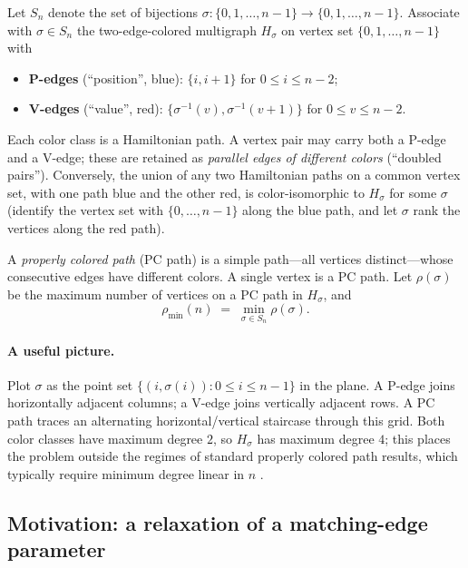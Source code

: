\documentclass[11pt]{article}
\theoremstyle{definition}
\newcommand{\pmin}{\rho_{\min}}
\newcommand{\inv}[1]{#1^{-1}}
\begin{document}
Let $S_n$ denote the set of bijections
$\sigma\colon \{0,1,\dots,n-1\}\to\{0,1,\dots,n-1\}$.
Associate with $\sigma \in S_n$ the two-edge-colored multigraph $H_\sigma$ on vertex
set $\{0,1,\dots,n-1\}$ with
\begin{itemize}
\item \textbf{P-edges} (``position'', blue): $\{i, i+1\}$ for $0 \le i \le n-2$;
\item \textbf{V-edges} (``value'', red): $\{\inv\sigma(v), \inv\sigma(v+1)\}$ for
$0 \le v \le n-2$.
\end{itemize}
Each color class is a Hamiltonian path. A vertex pair may carry both a P-edge and a
V-edge; these are retained as \emph{parallel edges of different colors} (``doubled
pairs''). Conversely, the union of any two Hamiltonian paths on a common vertex set,
with one path blue and the other red, is color-isomorphic to $H_\sigma$ for some
$\sigma$ (identify the vertex set with $\{0,\dots,n-1\}$ along the blue path, and let
$\sigma$ rank the vertices along the red path).

A \emph{properly colored path} (PC path) is a simple path---all vertices
distinct---whose consecutive edges have different colors. A single vertex is a PC
path. Let $\rho(\sigma)$ be the maximum number of vertices on a PC path in $H_\sigma$,
and
\[
\pmin(n) \;=\; \min_{\sigma\in S_n} \rho(\sigma) .
\]

\paragraph{A useful picture.} Plot $\sigma$ as the point set
$\{(i,\sigma(i)) : 0\le i\le n-1\}$ in the plane. A P-edge joins horizontally adjacent
columns; a V-edge joins vertically adjacent rows. A PC path traces an alternating
horizontal/vertical staircase through this grid. Both color classes have maximum
degree $2$, so $H_\sigma$ has maximum degree $4$; this places the problem outside the
regimes of standard properly colored path results, which typically require minimum
degree linear in $n$ \cite{ABMMM10}.

\subsection{Motivation: a relaxation of a matching-edge parameter}\label{subsec:motiv}
\end{document}
